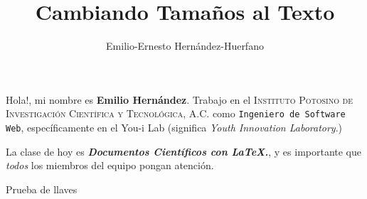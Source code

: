 \documentclass[12pt,letterpaper,oneside]{book}
\title{Cambiando Tamaños  al Texto}
\author{Emilio-Ernesto Hernández-Huerfano}
\begin{document}
\maketitle

Hola!, mi nombre es \textbf{\huge Emilio Hernández}. Trabajo en el \textsc{\scriptsize Instituto Potosino de Investigación Científica y Tecnológica, A.C.} como \texttt{Ingeniero de Software Web}, específicamente en el \textsf{\Huge You-i Lab} (significa \textit{Youth Innovation Laboratory}.)

La clase de hoy es \textbf{\textit{\Large Documentos Científicos con \LaTeX.}}, y es importante que \emph{todos} los miembros del equipo pongan atención.

{\LARGE Prueba de llaves}
\end{document}
